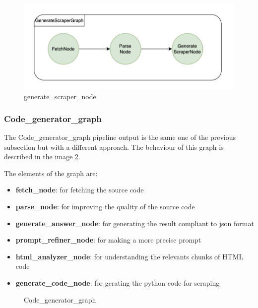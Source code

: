 \begin{figure}[h!]
    \centering
    \includegraphics[width=0.85\linewidth]{Assets/generate_script_graph.png}
    \caption{generate\_scraper\_node}
    \label{fig:enter-label}
\end{figure}
\subsubsection{Code\_generator\_graph}

The Code\_generator\_graph pipeline output is the same one of the previous subsection but with a different approach. The behaviour of this graph is described in the image \ref{fig:code-generator}.

The elements of the graph are:
\begin{itemize}
    \item \textbf{fetch\_node}: for fetching the source code
    \item \textbf{parse\_node}: for improving the quality of the source code 
    \item \textbf{generate\_answer\_node}: for generating the result compliant to json format
    \item \textbf{prompt\_refiner\_node}: for making a more precise prompt
    \item \textbf{html\_analyzer\_node}: for understanding the relevants chunks of HTML code 
    \item \textbf{generate\_code\_node}: for gerating the python code for scraping
\end{itemize}

\begin{figure}[h!]
    \centering
    \caption{Code\_generator\_graph}
    \label{fig:code-generator}
\end{figure}



